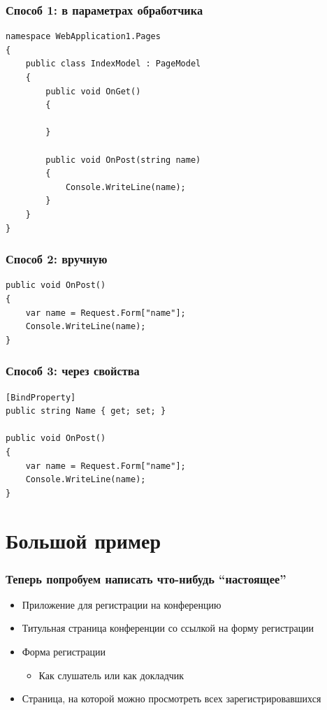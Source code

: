 \documentclass[xetex,mathserif,serif]{beamer}
\begin{document}
	\begin{frame}[fragile]
		\frametitle{Способ 1: в параметрах обработчика}
		\begin{small}
			\begin{verbatim}
namespace WebApplication1.Pages
{
    public class IndexModel : PageModel
    {
        public void OnGet()
        {

        }

        public void OnPost(string name)
        {
            Console.WriteLine(name);
        }
    }
}
			\end{verbatim}
		\end{small}
	\end{frame}

	\begin{frame}[fragile]
		\frametitle{Способ 2: вручную}
		\begin{small}
			\begin{verbatim}
public void OnPost()
{
    var name = Request.Form["name"];
    Console.WriteLine(name);
}
			\end{verbatim}
		\end{small}
	\end{frame}

	\begin{frame}[fragile]
		\frametitle{Способ 3: через свойства}
		\begin{small}
			\begin{verbatim}
[BindProperty]
public string Name { get; set; }

public void OnPost()
{
    var name = Request.Form["name"];
    Console.WriteLine(name);
}
			\end{verbatim}
		\end{small}
	\end{frame}

	\section{Большой пример}

	\begin{frame}
		\frametitle{Теперь попробуем написать что-нибудь ``настоящее''}
		\begin{itemize}
			\item Приложение для регистрации на конференцию
			\item Титульная страница конференции со ссылкой на форму регистрации
			\item Форма регистрации
			\begin{itemize}
				\item Как слушатель или как докладчик
			\end{itemize}
			\item Страница, на которой можно просмотреть всех зарегистрировавшихся
		\end{itemize}
	\end{frame}
\end{document}
